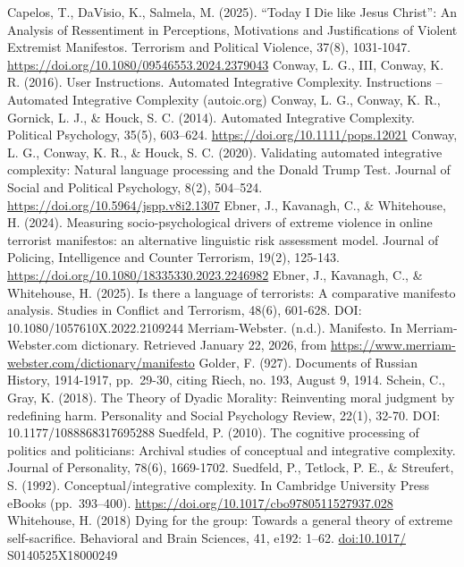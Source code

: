 \documentclass[
  english,
  man]{apa6}
\begin{document}
Capelos, T., DaVisio, K., Salmela, M. (2025). ``Today I Die like Jesus Christ'': An Analysis of Ressentiment in Perceptions, Motivations and Justifications of Violent Extremist Manifestos. Terrorism and Political Violence, 37(8), 1031-1047. \url{https://doi.org/10.1080/09546553.2024.2379043}
Conway, L. G., III, Conway, K. R. (2016). User Instructions. Automated Integrative Complexity. Instructions -- Automated Integrative Complexity (autoic.org)
Conway, L. G., Conway, K. R., Gornick, L. J., \& Houck, S. C. (2014). Automated Integrative Complexity. Political Psychology, 35(5), 603--624. \url{https://doi.org/10.1111/pops.12021}
Conway, L. G., Conway, K. R., \& Houck, S. C. (2020). Validating automated integrative complexity: Natural language processing and the Donald Trump Test. Journal of Social and Political Psychology, 8(2), 504--524. \url{https://doi.org/10.5964/jspp.v8i2.1307}
Ebner, J., Kavanagh, C., \& Whitehouse, H. (2024). Measuring socio-psychological drivers of extreme violence in online terrorist manifestos: an alternative linguistic risk assessment model. Journal of Policing, Intelligence and Counter Terrorism, 19(2), 125-143. \url{https://doi.org/10.1080/18335330.2023.2246982}
Ebner, J., Kavanagh, C., \& Whitehouse, H. (2025). Is there a language of terrorists: A comparative manifesto analysis. Studies in Conflict and Terrorism, 48(6), 601-628. DOI: 10.1080/1057610X.2022.2109244
Merriam-Webster. (n.d.). Manifesto. In Merriam-Webster.com dictionary. Retrieved January 22, 2026, from \url{https://www.merriam-webster.com/dictionary/manifesto}
Golder, F. (927). Documents of Russian History, 1914-1917, pp.~29-30, citing Riech, no. 193, August 9, 1914.
Schein, C., Gray, K. (2018). The Theory of Dyadic Morality: Reinventing moral judgment by redefining harm. Personality and Social Psychology Review, 22(1), 32-70. DOI: 10.1177/1088868317695288
Suedfeld, P. (2010). The cognitive processing of politics and politicians: Archival studies of conceptual and integrative complexity. Journal of Personality, 78(6), 1669-1702.
Suedfeld, P., Tetlock, P. E., \& Streufert, S. (1992). Conceptual/integrative complexity. In Cambridge University Press eBooks (pp.~393--400). \url{https://doi.org/10.1017/cbo9780511527937.028}
Whitehouse, H. (2018) Dying for the group: Towards a general theory of extreme self-sacrifice. Behavioral and Brain Sciences, 41, e192: 1--62. \url{doi:10.1017/} S0140525X18000249
\end{document}
